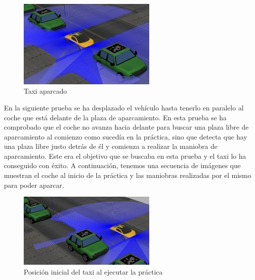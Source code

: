 \begin{figure}[H]
  \begin{center}
    \includegraphics[width=0.6\textwidth]{figures/Autopark/Experimento1_5.png}
		\caption{Taxi aparcado}
		\label{fig.Experimento1_5}
		\end{center}
\end{figure}

En la siguiente prueba se ha desplazado el vehículo hasta tenerlo en paralelo al coche que está delante de la plaza de aparcamiento. En esta prueba se ha comprobado que el coche no avanza hacia delante para buscar una plaza libre de aparcamiento al comienzo como sucedía en la práctica, sino que detecta que hay una plaza libre justo detrás de él y comienza a realizar la maniobra de aparcamiento. Este era el objetivo que se buscaba en esta prueba y el taxi lo ha conseguido con éxito. A continuación, tenemos una secuencia de imágenes que muestran el coche al inicio de la práctica y las maniobras realizadas por el mismo para poder aparcar.\\

\begin{figure}[H]
  \begin{center}
    \includegraphics[width=0.6\textwidth]{figures/Autopark/Experimento2_1.png}
		\caption{Posición inicial del taxi al ejecutar la práctica}
		\label{fig.Experimento2_1}
		\end{center}
\end{figure}

